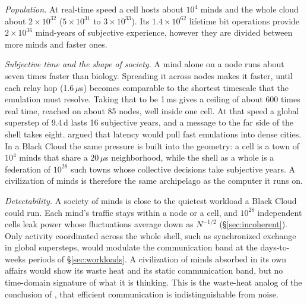 \documentclass[final,5p]{elsarticle}
\begin{document}
\emph{Population.} At real-time speed a cell hosts about $10^4$ minds and the whole cloud about $2\times10^{32}$ ($5\times10^{31}$ to $3\times10^{33}$). Its $1.4\times10^{62}$ lifetime bit operations provide $2\times10^{36}$ mind-years of subjective experience, however they are divided between more minds and faster ones.

\emph{Subjective time and the shape of society.} A mind alone on a node runs about seven times faster than biology. Spreading it across nodes makes it faster, until each relay hop (1.6\,$\mu$s) becomes comparable to the shortest timescale that the emulation must resolve. Taking that to be 1\,ms gives a ceiling of about 600 times real time, reached on about 85 nodes, well inside one cell. At that speed a global superstep of 9.4\,d lasts 16 subjective years, and a message to the far side of the shell takes eight. \citet{Hanson2016} argued that latency would pull fast emulations into dense cities. In a Black Cloud the same pressure is built into the geometry: a cell is a town of $10^4$ minds that share a $20\,\mu$s neighborhood, while the shell as a whole is a federation of $10^{28}$ such towns whose collective decisions take subjective years. A civilization of minds is therefore the same archipelago as the computer it runs on.

\emph{Detectability.} A society of minds is close to the quietest workload a Black Cloud could run. Each mind's traffic stays within a node or a cell, and $10^{28}$ independent cells leak power whose fluctuations average down as $N^{-1/2}$ (\S\ref{sec:incoherent}). Only activity coordinated across the whole shell, such as synchronized exchange in global supersteps, would modulate the communication band at the days-to-weeks periods of \S\ref{sec:workloads}. A civilization of minds absorbed in its own affairs would show its waste heat and its static communication band, but no time-domain signature of what it is thinking. This is the waste-heat analog of the conclusion of \citet{Guillochon2026}, that efficient communication is indistinguishable from noise.
\end{document}
